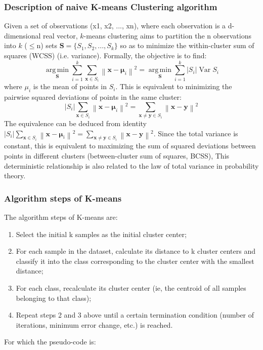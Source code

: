 \documentclass[]{article}
\begin{document}
\subsubsection{Description of naive K-means Clustering algorithm}
Given a set of observations (x1, x2, ..., xn), where each observation is a d-dimensional real vector, $k$-means clustering aims to partition the n observations into $k$ ($\leq$n) sets $\textbf{S} = \{S_1, S_2, ..., S_k\}$ so as to minimize the within-cluster sum of squares (WCSS) (i.e. variance). Formally, the objective is to find:
$$\displaystyle {\underset {\mathbf {S} }{\operatorname {arg\,min} }}\sum _{i=1}^{k}\sum _{\mathbf {x} \in S_{i}}\left\|\mathbf {x} -{\boldsymbol {\mu }}_{i}\right\|^{2}={\underset {\mathbf {S} }{\operatorname {arg\,min} }}\sum _{i=1}^{k}|S_{i}|\operatorname {Var} S_{i}$$
where $\mu_{i}$ is the mean of points in $S_i$. This is equivalent to minimizing the pairwise squared deviations of points in the same cluster:
$$\displaystyle |S_{i}|\sum _{\mathbf {x} \in S_{i}}\left\|\mathbf {x} -{\boldsymbol {\mu }}_{i}\right\|^{2}=\sum _{\mathbf {x} \neq \mathbf {y} \in S_{i}}\left\|\mathbf {x} -\mathbf {y} \right\|^{2}$$
The equivalence can be deduced from identity $\displaystyle |S_{i}|\sum _{\mathbf {x} \in S_{i}}\left\|\mathbf {x} -{\boldsymbol {\mu }}_{i}\right\|^{2}=\sum _{\mathbf {x} \neq \mathbf {y} \in S_{i}}\left\|\mathbf {x} -\mathbf {y} \right\|^{2}$.
Since the total variance is constant, this is equivalent to maximizing the sum of squared deviations between points in different clusters (between-cluster sum of squares, BCSS), This deterministic relationship is also related to the law of total variance in probability theory.\\

\subsubsection{Algorithm steps of K-means}
The algorithm steps of K-means are:


\begin{enumerate}
	\item Select the initial k samples as the initial cluster center;
	\item For each sample in the dataset, calculate its distance to k cluster centers and classify it into the class corresponding to the cluster center with the smallest distance;
	\item For each class, recalculate its cluster center (ie, the centroid of all samples belonging to that class);
	\item Repeat steps 2 and 3 above until a certain termination condition (number of iterations, minimum error change, etc.) is reached.	
\end{enumerate}
For which the pseudo-code is:
\end{document}
